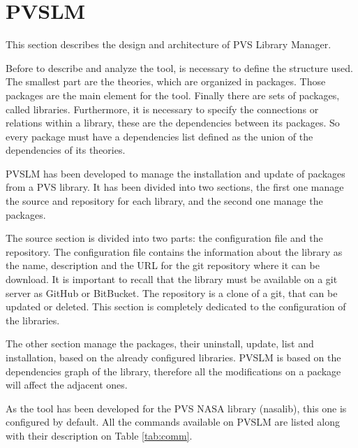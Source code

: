 \section{PVSLM}
\label{sec:pvslm}

This section describes the design and architecture of PVS Library Manager.

Before to describe and analyze the tool, is necessary to define the structure used. The smallest part are the theories, which are organized in packages. Those packages are the main element for the tool. Finally there are sets of packages, called libraries. Furthermore, it is necessary to specify the connections or relations within a library, these are the dependencies between its packages. So every package must have a dependencies list defined as the union of the dependencies of its theories.

PVSLM has been developed to manage the installation and update of packages from a PVS library. It has been divided into two sections, the first one manage the source and repository for each library, and the second one manage the packages.

The source section is divided into two parts: the configuration file and the repository. The configuration file contains the information about the library as the name, description and the URL for the git repository where it can be download. It is important to recall that the library must be available on a git server as GitHub or BitBucket. The repository is a clone of a git, that can be updated or deleted. This section is completely dedicated to the configuration of the libraries.

The other section manage the packages, their uninstall, update, list and installation, based on the already configured libraries. PVSLM is based on the dependencies graph of the library, therefore all the modifications on a package will affect the adjacent ones.

As the tool has been developed for the PVS NASA library (nasalib), this one is configured by default. All the commands available on PVSLM are listed along with their description on Table \ref{tab:comm}.


